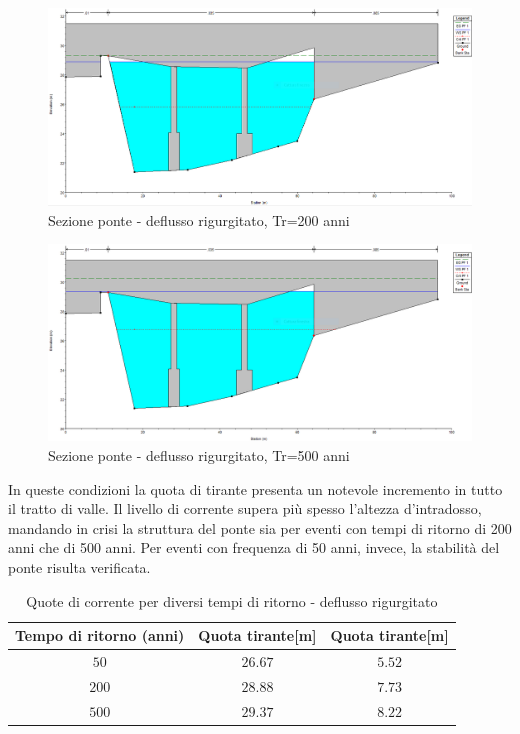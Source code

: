 \documentclass[12pt]{article} %
\begin{document}
\begin{figure}[H]
    \centering
    \includegraphics[scale=0.5]{PonteUP8.PNG}
    \caption{Sezione ponte - deflusso rigurgitato, Tr=200 anni}
\end{figure}

\begin{figure}[H]
    \centering
    \includegraphics[scale=0.5]{PonteUP82.PNG}
    \caption{Sezione ponte - deflusso rigurgitato, Tr=500 anni}
\end{figure}

\noindent In queste condizioni la quota di tirante presenta un notevole incremento in tutto il tratto di valle. Il livello di corrente supera più spesso l'altezza d'intradosso, mandando in crisi la struttura del ponte sia per eventi con tempi di ritorno di 200 anni che di 500 anni. Per eventi con frequenza di 50 anni, invece, la stabilità del ponte risulta verificata.

\begin{table}[H]
    \centering
    \begin{tabular}{ccc}
        \hline
        \textbf{Tempo di ritorno (anni)} &\textbf{Quota tirante[m]}& \textbf{Quota tirante[m]} \\
        \hline
        $50$ & $26.67$ & $5.52$\\
        $200$ & $28.88$ & $7.73$\\
        $500$ & $29.37$ & $8.22$\\
        \hline
    \end{tabular}
    \caption{Quote di corrente per diversi tempi di ritorno - deflusso rigurgitato}
\end{table}
\end{document}
